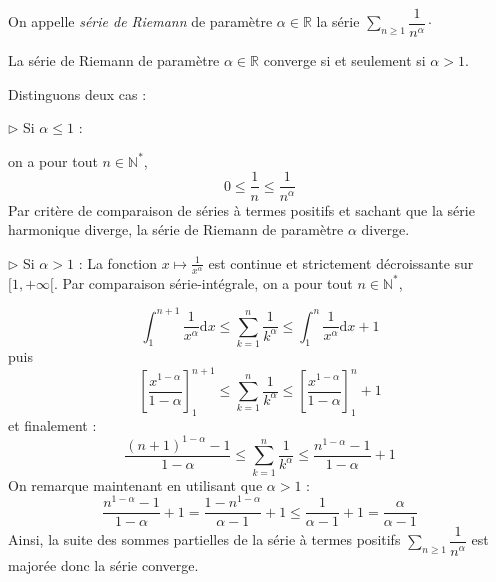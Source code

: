 \documentclass[french,11pt,twoside]{VcCours}
\newcommand{\dx}{\text{d}x}
\newcommand{\Sum}[2]{\ensuremath{\textstyle{\sum\limits_{#1}^{#2}}}}
\begin{document}
\begin{Definition}{}
On appelle \emph{série de Riemann} de paramètre $\alpha \in \mathbb{R}$ la série $\Sum{n \geq 1}{} \dfrac{1}{n^{\alpha}} \cdot$
\end{Definition}

\begin{Theoreme}{}
La série de Riemann de paramètre $\alpha \in \mathbb{R}$ converge si et seulement si $\alpha >1$.
\end{Theoreme}

\begin{Demonstration}{} Distinguons deux cas :

$\rhd$ Si $\alpha \leq 1$ :

on a pour tout $n \in \mathbb{N}^*$,
$$ 0 \leq \frac{1}{n} \leq \frac{1}{n^{\alpha}}$$
Par critère de comparaison de séries à termes positifs et sachant que la série harmonique diverge, la série de Riemann de paramètre $\alpha$ diverge.

\medskip



$\rhd$ Si $\alpha>1$ :
La fonction $x \mapsto \frac{1}{x^{\alpha}}$ est continue et strictement décroissante sur $[1, + \infty[$. Par comparaison série-intégrale, on a pour tout $n \in \mathbb{N}^*$,

$$\int_{1}^{n+1} \frac{1}{x^{\alpha}} \dx \leq \sum_{k=1}^n \frac{1}{k^{\alpha}} \leq \int_{1}^{n} \frac{1}{x^{\alpha}} \dx +1$$
puis 
$$ \left[ \frac{x^{1-\alpha}}{1- \alpha} \right]_1^{n+1}  \leq \sum_{k=1}^n \frac{1}{k^{\alpha}} \leq  \left[ \frac{x^{1-\alpha}}{1- \alpha} \right]_1^{n} + 1 $$
et finalement :
\begin{equation}\label{SerieRiemann}
\frac{(n+1)^{1-\alpha}-1}{1 - \alpha} \leq \sum_{k=1}^n \frac{1}{k^{\alpha}} \leq   \frac{n^{1-\alpha}-1}{1 - \alpha} + 1
\end{equation}
On remarque maintenant en utilisant que $\alpha>1$ :
$$ \frac{n^{1-\alpha}-1}{1 - \alpha} + 1 = \frac{1-n^{1-\alpha}}{\alpha-1} + 1 \leq \frac{1}{\alpha-1} + 1 = \frac{\alpha}{\alpha-1}$$
Ainsi, la suite des sommes partielles de la série à termes positifs $\Sum{n \geq 1}{} \dfrac{1}{n^{\alpha}}$ est majorée donc la série converge.
\end{Demonstration}
\end{document}
